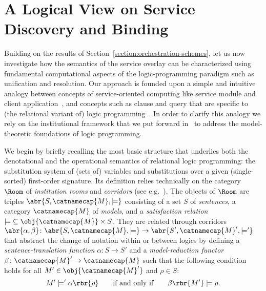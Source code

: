 \documentclass{LMCS}
\begin{document}
  \section{A Logical View on Service Discovery and Binding}
  \label{section:service-discovery-and-binding}

  Building on the results of Section~\ref{section:orchestration-schemes}, let us now investigate how the semantics of the service overlay can be characterized using fundamental computational aspects of the logic-programming paradigm such as unification and resolution.
  Our approach is founded upon a simple and intuitive analogy between concepts of service-oriented computing like service module and client application~\cite{Fiadeiro-Lopes-Bocchi:An-abstract-model-for-service-discovery-and-binding-2011}, and concepts such as clause and query that are specific to (the relational variant of) logic programming~\cite{Lloyd:Foundations-of-Logic-Programming-1987}.
  In order to clarify this analogy we rely on the institutional framework that we put forward in~\cite{Tutu-Fiadeiro:Institution-independent-logic-programming-2015} to address the model-theoretic foundations of logic programming.

  We begin by briefly recalling the most basic structure that underlies both the denotational and the operational semantics of relational logic programming: the substitution system of (sets of) variables and substitutions over a given (single-sorted) first-order signature.
  Its definition relies technically on the category \(\Room\) of \emph{institution rooms} and \emph{corridors} (see e.g.~\cite{Mossakowski:Comorphism-based-Grothendieck-logics-2002}). The objects of \(\Room\) are triples \(\abr{S, \catnamecap{M}, \models}\) consisting of a set \(S\) of \emph{sentences}, a category \(\catnamecap{M}\) of \emph{models}, and a \emph{satisfaction relation} \({\models} \subseteq \obj{\catnamecap{M}} \times S\). They are related through corridors \(\abr{\alpha, \beta} \colon \abr{S, \catnamecap{M}, \models} \to \abr{S', \catnamecap{M}', \models'}\) that abstract the change of notation within or between logics by defining a \emph{sentence-translation function} \(\alpha \colon S \to S'\) and a \emph{model-reduction functor} \(\beta \colon \catnamecap{M}' \to \catnamecap{M}\) such that the following condition holds for all \(M' \in \obj{\catnamecap{M}'}\) and \(\rho \in S\):
  \[
  M' \models' \alpha\rbr{\rho}
  \qquad \text{if and only if} \qquad 
  \beta\rbr{M'} \models \rho.
  \]
\end{document}
